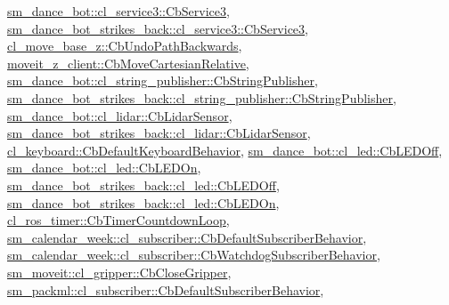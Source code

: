 \hyperlink{classsm__dance__bot_1_1cl__service3_1_1CbService3_ae9e3796b507ad96cc0890fec0f64a4b7}{sm\+\_\+dance\+\_\+bot\+::cl\+\_\+service3\+::\+Cb\+Service3}, \hyperlink{classsm__dance__bot__strikes__back_1_1cl__service3_1_1CbService3_a09a2fda38973e1e3915b63a47ca67ed1}{sm\+\_\+dance\+\_\+bot\+\_\+strikes\+\_\+back\+::cl\+\_\+service3\+::\+Cb\+Service3}, \hyperlink{classcl__move__base__z_1_1CbUndoPathBackwards_a32e680530375b62c7053bf173f6b2b1b}{cl\+\_\+move\+\_\+base\+\_\+z\+::\+Cb\+Undo\+Path\+Backwards}, \hyperlink{classmoveit__z__client_1_1CbMoveCartesianRelative_aaea0e6c7431f93301a77269b8fa539f8}{moveit\+\_\+z\+\_\+client\+::\+Cb\+Move\+Cartesian\+Relative}, \hyperlink{classsm__dance__bot_1_1cl__string__publisher_1_1CbStringPublisher_a7aa533578e820ee90d92d15b85d42e9b}{sm\+\_\+dance\+\_\+bot\+::cl\+\_\+string\+\_\+publisher\+::\+Cb\+String\+Publisher}, \hyperlink{classsm__dance__bot__strikes__back_1_1cl__string__publisher_1_1CbStringPublisher_a2c3963143fe180a5e5f939362857d2e0}{sm\+\_\+dance\+\_\+bot\+\_\+strikes\+\_\+back\+::cl\+\_\+string\+\_\+publisher\+::\+Cb\+String\+Publisher}, \hyperlink{structsm__dance__bot_1_1cl__lidar_1_1CbLidarSensor_aad3468a6ae78999c9fd01bdb81b42a49}{sm\+\_\+dance\+\_\+bot\+::cl\+\_\+lidar\+::\+Cb\+Lidar\+Sensor}, \hyperlink{structsm__dance__bot__strikes__back_1_1cl__lidar_1_1CbLidarSensor_a82d0250dcf2d4e9b12ccd528a5d87002}{sm\+\_\+dance\+\_\+bot\+\_\+strikes\+\_\+back\+::cl\+\_\+lidar\+::\+Cb\+Lidar\+Sensor}, \hyperlink{classcl__keyboard_1_1CbDefaultKeyboardBehavior_a06e49d8c78aeffecf74c27b05f529a3a}{cl\+\_\+keyboard\+::\+Cb\+Default\+Keyboard\+Behavior}, \hyperlink{classsm__dance__bot_1_1cl__led_1_1CbLEDOff_a3c0ed097db52baae1928a19936f09a83}{sm\+\_\+dance\+\_\+bot\+::cl\+\_\+led\+::\+Cb\+L\+E\+D\+Off}, \hyperlink{classsm__dance__bot_1_1cl__led_1_1CbLEDOn_a3b7de8585d728becefb8c2c5cc3b6d95}{sm\+\_\+dance\+\_\+bot\+::cl\+\_\+led\+::\+Cb\+L\+E\+D\+On}, \hyperlink{classsm__dance__bot__strikes__back_1_1cl__led_1_1CbLEDOff_acde07c4940b5f210ddaa8aaac60b03c2}{sm\+\_\+dance\+\_\+bot\+\_\+strikes\+\_\+back\+::cl\+\_\+led\+::\+Cb\+L\+E\+D\+Off}, \hyperlink{classsm__dance__bot__strikes__back_1_1cl__led_1_1CbLEDOn_a49de8ffe1304efb84e10a76c4d309d89}{sm\+\_\+dance\+\_\+bot\+\_\+strikes\+\_\+back\+::cl\+\_\+led\+::\+Cb\+L\+E\+D\+On}, \hyperlink{classcl__ros__timer_1_1CbTimerCountdownLoop_aa088f15db4fb2c307c86b30b2e1f7744}{cl\+\_\+ros\+\_\+timer\+::\+Cb\+Timer\+Countdown\+Loop}, \hyperlink{classsm__calendar__week_1_1cl__subscriber_1_1CbDefaultSubscriberBehavior_ab92e1f50bb88e3b47c2ee4520fecb719}{sm\+\_\+calendar\+\_\+week\+::cl\+\_\+subscriber\+::\+Cb\+Default\+Subscriber\+Behavior}, \hyperlink{classsm__calendar__week_1_1cl__subscriber_1_1CbWatchdogSubscriberBehavior_a291895411a45ffe349a6117d51e11212}{sm\+\_\+calendar\+\_\+week\+::cl\+\_\+subscriber\+::\+Cb\+Watchdog\+Subscriber\+Behavior}, \hyperlink{classsm__moveit_1_1cl__gripper_1_1CbCloseGripper_adc772dda477c6370dc41117613e35699}{sm\+\_\+moveit\+::cl\+\_\+gripper\+::\+Cb\+Close\+Gripper}, \hyperlink{classsm__packml_1_1cl__subscriber_1_1CbDefaultSubscriberBehavior_abee6ee854163b3724cd9010bc474592e}{sm\+\_\+packml\+::cl\+\_\+subscriber\+::\+Cb\+Default\+Subscriber\+Behavior}, 